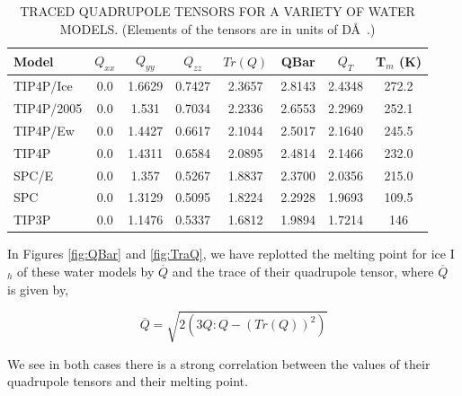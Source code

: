 \begin{table}[h!]
\caption{TRACED QUADRUPOLE TENSORS FOR A VARIETY OF WATER MODELS. (Elements of the tensors are in units of D\AA~.)}
\label{Models_quad}
\begin{tabular}{|l|c|c|c|c|c|c|c|}
\hline
Model & $Q_{xx}$ & $Q_{yy}$ & $Q_{zz}$ & $Tr(Q)$ & QBar & $Q_{T}$ &
                                                                    T$_{m}$ (K) \\
\hline
TIP4P/Ice & 0.0 & 1.6629 & 0.7427 & 2.3657 & 2.8143 & 2.4348  & 272.2 \\
TIP4P/2005 & 0.0 & 1.531 & 0.7034 & 2.2336 & 2.6553 & 2.2969  & 252.1 \\
TIP4P/Ew & 0.0 & 1.4427 & 0.6617 & 2.1044  & 2.5017 & 2.1640  & 245.5   \\
TIP4P & 0.0 & 1.4311 & 0.6584 & 2.0895 & 2.4814 & 2.1466 & 232.0 \\
SPC/E & 0.0 & 1.357 & 0.5267 & 1.8837 & 2.3700 & 2.0356 & 215.0 \\
SPC & 0.0 & 1.3129 & 0.5095 & 1.8224 & 2.2928 & 1.9693 & 109.5 \\
TIP3P & 0.0 & 1.1476 & 0.5337 & 1.6812 & 1.9894 & 1.7214 & 146 \\
\hline
\end{tabular}
\end{table} 

In Figures \ref{fig:QBar} and \ref{fig:TraQ},
we have replotted the 
melting point for ice I$_h$ of these water models by $\overline{Q}$ and the 
trace of their
quadrupole tensor, where $\overline{Q}$ is given by,

\begin{equation}
\overline{Q} = \sqrt{2(3 Q:Q - (Tr(Q))^{2})}
\end{equation}

We see in both cases there is a strong correlation between
the values of their quadrupole tensors and their melting point.

